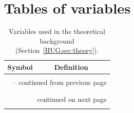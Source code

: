 \documentclass[11pt, oneside]{article}   	%
\begin{document}



\clearpage
\section{Tables of variables}
\textwidth
\begin{longtable}{l p{12cm}}
\caption{Variables used in the theoretical background (Section~\ref{HUG:sec:theory}).}
\label{HUG:tab:var_theory} \\

Symbol & Definition \\ \hline \hline
\multicolumn{2}{l}{} \\
\endfirsthead

\multicolumn{2}{c}{{\tablename\ \thetable{} -- continued from previous page}} \\
\multicolumn{2}{l}{} \\
\endhead

\multicolumn{2}{l}{} \\
\multicolumn{2}{r}{{continued on next page}} \\
\endfoot

\endlastfoot


\end{longtable}
\end{document}
